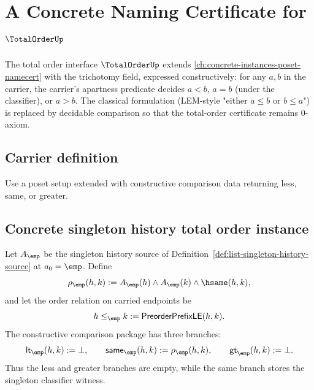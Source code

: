 \chapter{A Concrete Naming Certificate for \(\TotalOrderUp\)}
\label{ch:concrete-instances-totalorder-namecert}

The total order interface \(\TotalOrderUp\) extends \autoref{ch:concrete-instances-poset-namecert} with the trichotomy field, expressed constructively: for any \(a, b\) in the carrier, the carrier's apartness predicate decides \(a < b\), \(a = b\) (under the classifier), or \(a > b\). The classical formulation (LEM-style "either \(a \le b\) or \(b \le a\)") is replaced by decidable comparison so that the total-order certificate remains 0-axiom.

\section{Carrier definition}

\begin{definition}
\label{def:totalorder-carrier}
Use a poset setup extended with constructive comparison data returning less, same, or greater.
\end{definition}

\section{Concrete singleton history total order instance}
\label{sec:totalorder-concrete-singleton-history-instance}

\begin{definition}
\label{def:concrete-singleton-history-totalorder-instance}
Let $A_{\emp}$ be the singleton history source of
Definition~\ref{def:list-singleton-history-source} at $a_0=\emp$. Define
$$
\rho_{\emp}(h,k):=
A_{\emp}(h)\land A_{\emp}(k)\land\hsame(h,k),
$$
and let the order relation on carried endpoints be
$$
h\le_{\emp}k:=\mathsf{PreorderPrefixLE}(h,k).
$$
The constructive comparison package has three branches:
$$
\mathsf{lt}_{\emp}(h,k):=\bot,\qquad
\mathsf{same}_{\emp}(h,k):=\rho_{\emp}(h,k),\qquad
\mathsf{gt}_{\emp}(h,k):=\bot.
$$
Thus the less and greater branches are empty, while the same branch stores the
singleton classifier witness.
\end{definition}

